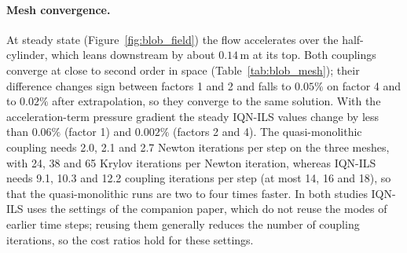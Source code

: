 \paragraph{Mesh convergence.}
At steady state (Figure~\ref{fig:blob_field}) the flow accelerates over the half-cylinder, which leans downstream by about $0.14\,\mathrm{m}$ at its top.
Both couplings converge at close to second order in space (Table~\ref{tab:blob_mesh}); their difference changes sign between factors 1 and 2 and falls to $0.05\%$ on factor 4 and to $0.02\%$ after extrapolation, so they converge to the same solution.
With the acceleration-term pressure gradient the steady IQN-ILS values change by less than $0.06\%$ (factor 1) and $0.002\%$ (factors 2 and 4).
The quasi-monolithic coupling needs 2.0, 2.1 and 2.7 Newton iterations per step on the three meshes, with 24, 38 and 65 Krylov iterations per Newton iteration, whereas IQN-ILS needs 9.1, 10.3 and 12.2 coupling iterations per step (at most 14, 16 and 18), so that the quasi-monolithic runs are two to four times faster.
In both studies IQN-ILS uses the settings of the companion paper, which do not reuse the modes of earlier time steps; reusing them generally reduces the number of coupling iterations, so the cost ratios hold for these settings.


